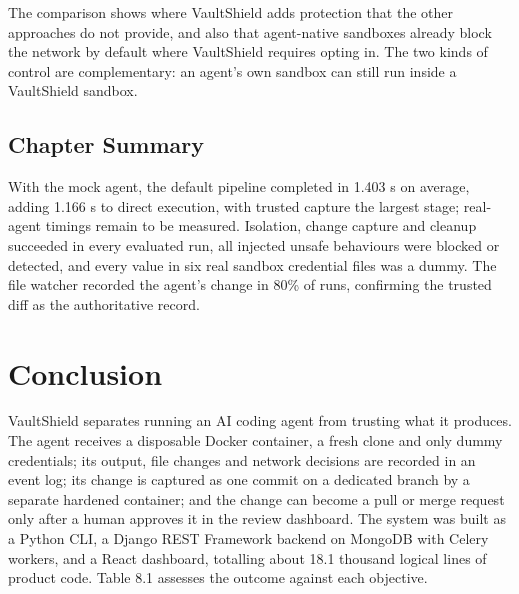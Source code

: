 \documentclass[12pt,a4paper,oneside]{report}
\begin{document}
\addtocounter{table}{-1}
\par\medskip
\endgroup

The comparison shows where VaultShield adds protection that the other approaches do not provide, and also that agent-native sandboxes already block the network by default where VaultShield requires opting in. The two kinds of control are complementary: an agent's own sandbox can still run inside a VaultShield sandbox.


\section{Chapter Summary}\label{chapter-summary}

With the mock agent, the default pipeline completed in 1.403 s on average, adding 1.166 s to direct execution, with trusted capture the largest stage; real-agent timings remain to be measured. Isolation, change capture and cleanup succeeded in every evaluated run, all injected unsafe behaviours were blocked or detected, and every value in six real sandbox credential files was a dummy. The file watcher recorded the agent's change in 80\% of runs, confirming the trusted diff as the authoritative record.

\clearpage

\chapter{Conclusion}\label{conclusion}

VaultShield separates running an AI coding agent from trusting what it produces. The agent receives a disposable Docker container, a fresh clone and only dummy credentials; its output, file changes and network decisions are recorded in an event log; its change is captured as one commit on a dedicated branch by a separate hardened container; and the change can become a pull or merge request only after a human approves it in the review dashboard. The system was built as a Python CLI, a Django REST Framework backend on MongoDB with Celery workers, and a React dashboard, totalling about 18.1 thousand logical lines of product code. Table 8.1 assesses the outcome against each objective.
\end{document}
